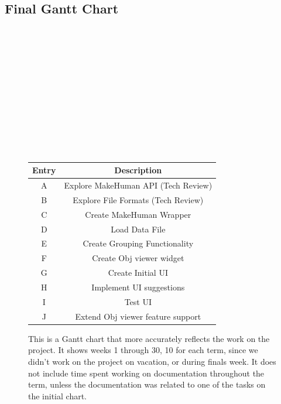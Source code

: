 \documentclass[letterpaper,10pt, onecolumn, draftclsnofoot]{IEEEtran}
\begin{document}
\subsection{Final Gantt Chart}
\begin{figure}[h!]
	\begin{ganttchart}[vgrid={*1{black, dotted}}]{1}{30}
		\\
		\\
		
		
		 \\
		 \\
		 \\
		 \\
		 \\
		 \\
		 \\
		 \\
		 \\
		
	\end{ganttchart}
	\begin{tabular}{|c|c|}
		\hline
		Entry & Description \\
		\hline
		\hline
		A & Explore MakeHuman API (Tech Review) \\
		\hline
		B & Explore File Formats (Tech Review) \\
		\hline
		C & Create MakeHuman Wrapper \\
		\hline
		D & Load Data File \\
		\hline
		E & Create Grouping Functionality \\
		\hline
		F & Create Obj viewer widget \\
		\hline
		G & Create Initial UI \\
		\hline
		H & Implement UI suggestions\\
		\hline
		I & Test UI \\
		\hline
		J & Extend Obj viewer feature support\\
		\hline
		
	\end{tabular}
	\caption{This is a Gantt chart that more accurately reflects the work on the project. It shows weeks 1 through 30, 10 for each term, since we didn't work on the project on vacation, or during finals week. It does not include time spent working on documentation throughout the term, unless the documentation was related to one of the tasks on the initial chart.}
\end{figure}
\pagebreak
\end{document}
